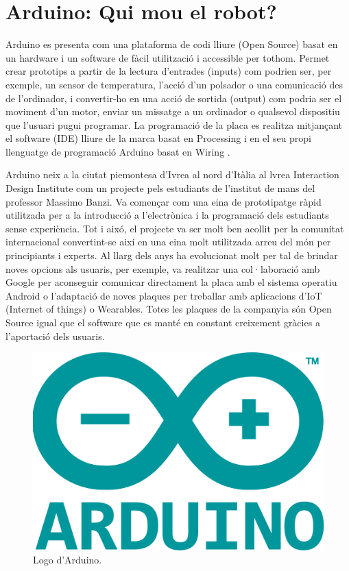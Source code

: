 \section{Arduino: Qui mou el robot?}

Arduino es presenta com una plataforma de codi lliure (Open Source) basat en un hardware i un software de fàcil utilització i accessible per tothom.  Permet crear prototips a partir de la lectura d’entrades (inputs) com podrien ser, per exemple, un sensor de temperatura, l’acció d’un polsador o una comunicació des de l’ordinador, i convertir-ho en una acció de sortida (output) com podria ser el moviment d’un motor, enviar un missatge a un ordinador o qualsevol dispositiu que l’usuari pugui programar. La programació de la placa es realitza mitjançant el software (IDE) lliure de la marca basat en Processing i en el seu propi llenguatge de programació Arduino basat en Wiring \cite{arduinoBib} \cite{massimobanzi2011}. 

Arduino neix a la ciutat piemontesa d’Ivrea al nord d’Itàlia al lvrea Interaction Design Institute com un projecte pels estudiants de l’institut de mans del professor Massimo Banzi. Va començar com una eina de prototipatge ràpid utilitzada per a la introducció a l’electrònica i la programació dels estudiants sense experiència. Tot i aixó, el projecte va ser molt ben acollit per la comunitat internacional convertint-se així en una eina molt utilitzada arreu del món per principiants i experts. Al llarg dels anys ha evolucionat molt per tal de brindar noves opcions als usuaris, per exemple, va realitzar una col·laboració amb Google per aconseguir comunicar directament la placa amb el sistema operatiu Android o l’adaptació de noves plaques per treballar amb aplicacions d’IoT (Internet of things) o Wearables. Totes les plaques de la companyia són Open Source igual que el software que es manté en constant creixement gràcies a l’aportació dels usuaris. 

\begin{figure}[H]
	\centering
	\includegraphics[scale=0.1]{arduino-logo.png}
	\caption{Logo d'Arduino.}
	\label{fig:arduinologo}
\end{figure}


